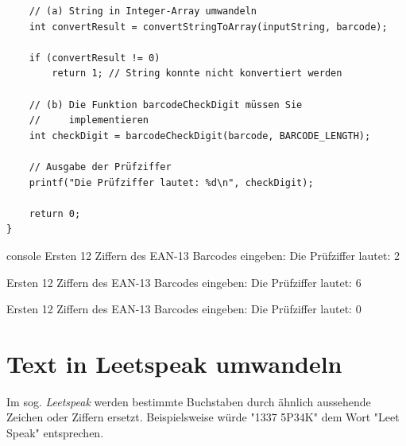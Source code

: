 \begin{enumerate}
\begin{verbatim}
    // (a) String in Integer-Array umwandeln
    int convertResult = convertStringToArray(inputString, barcode);

    if (convertResult != 0)
        return 1; // String konnte nicht konvertiert werden

    // (b) Die Funktion barcodeCheckDigit müssen Sie
    //     implementieren
    int checkDigit = barcodeCheckDigit(barcode, BARCODE_LENGTH);

    // Ausgabe der Prüfziffer
    printf("Die Prüfziffer lautet: %d\n", checkDigit);

    return 0;
}
\end{verbatim}

\begin{mybox}[Bildschirmausgabe]{console}
Ersten 12 Ziffern des EAN-13 Barcodes eingeben:
Die Prüfziffer lautet: 2

Ersten 12 Ziffern des EAN-13 Barcodes eingeben:
Die Prüfziffer lautet: 6

Ersten 12 Ziffern des EAN-13 Barcodes eingeben:
Die Prüfziffer lautet: 0
\end{mybox}

\end{enumerate}




\chapter{Text in Leetspeak umwandeln}

\vspace{10pt}

Im sog. \textit{Leetspeak} werden bestimmte Buchstaben durch ähnlich aussehende
Zeichen oder Ziffern ersetzt. Beispielsweise würde "\textsf{1337 5P34K}" dem
Wort "\textsf{Leet Speak}" entsprechen.

